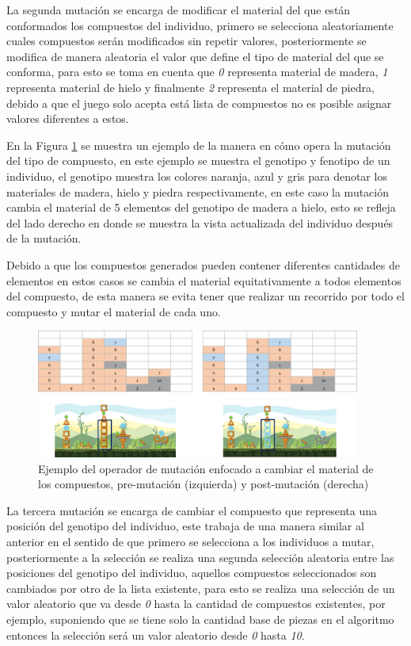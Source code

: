 La segunda mutación se encarga de modificar el material del que están
conformados los compuestos del individuo, primero se selecciona aleatoriamente 
cuales compuestos serán modificados sin
repetir valores, posteriormente se modifica de manera aleatoria el valor que
define el tipo de material del que se conforma, para esto se toma en cuenta que
\textit{0} representa material de madera, \textit{1} representa material de
hielo y finalmente \textit{2} representa el material de piedra, debido a que el
juego solo acepta está lista de compuestos no es posible asignar valores
diferentes a estos.

En la Figura \ref{figure:mutate_material} se muestra un ejemplo de la manera en
cómo opera la mutación del tipo de compuesto, en este ejemplo se muestra el
genotipo y fenotipo de un individuo, el genotipo muestra los colores naranja,
azul y gris para denotar los materiales de madera, hielo y piedra
respectivamente, en este caso la mutación cambia el material de 5 elementos del
genotipo de madera a hielo, esto se refleja del lado derecho en donde se muestra
la vista actualizada del individuo después de la mutación.

Debido a que los compuestos generados pueden contener diferentes cantidades de
elementos en estos casos se cambia el material equitativamente a todos elementos
del compuesto, de esta manera se evita tener que realizar un recorrido por todo
el compuesto y mutar el material de cada uno.

\begin{figure}
  \centering
  \includegraphics[width=0.95\textwidth]{img/mutation_material.png}
  \caption{Ejemplo del operador de mutación enfocado a cambiar el material de los compuestos, pre-mutación (izquierda) y post-mutación (derecha)}
  \label{figure:mutate_material}
\end{figure}

La tercera mutación se encarga de cambiar el compuesto que representa una
posición del genotipo del individuo, este trabaja de una manera similar al
anterior en el sentido de que primero se selecciona a los individuos a mutar,
posteriormente a la selección se realiza una segunda selección aleatoria entre
las posiciones del genotipo del individuo, aquellos compuestos seleccionados son
cambiados por otro de la lista existente, para esto se realiza una selección de
un valor aleatorio que va desde \textit{0} hasta la cantidad de compuestos
existentes, por ejemplo, suponiendo que se tiene solo la cantidad base de piezas
en el algoritmo entonces la selección será un valor aleatorio desde \textit{0}
hasta \textit{10}.

